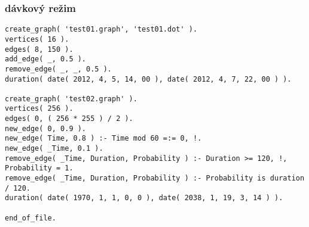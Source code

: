 \documentclass[11pt, a4paper]{article}
\theoremstyle{plain}
\theoremstyle{definition}
\theoremstyle{remark}
\begin{document}
\subsubsection{dávkový režim}

\begin{lstlisting}[firstnumber=1]
% gen_graph.pl
create_graph( 'test01.graph', 'test01.dot' ).
vertices( 16 ).
edges( 8, 150 ).
add_edge( _, 0.5 ).
remove_edge( _, _, 0.5 ).
duration( date( 2012, 4, 5, 14, 00 ), date( 2012, 4, 7, 22, 00 ) ).

create_graph( 'test02.graph' ).
vertices( 256 ).
edges( 0, ( 256 * 255 ) / 2 ).
new_edge( 0, 0.9 ).
new_edge( Time, 0.8 ) :- Time mod 60 =:= 0, !.
new_edge( _Time, 0.1 ).
remove_edge( _Time, Duration, Probability ) :- Duration >= 120, !, Probability = 1.
remove_edge( _Time, Duration, Probability ) :- Probability is duration / 120.
duration( date( 1970, 1, 1, 0, 0 ), date( 2038, 1, 19, 3, 14 ) ).

end_of_file.
\end{lstlisting}
\end{document}

